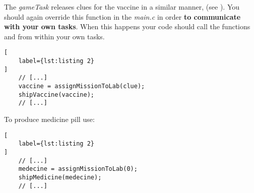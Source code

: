 The \textit{gameTask} releases clues for the vaccine in a similar manner, (see ). You should again override this function in the \textit{main.c} in order \textbf{to communicate with your own tasks}. 
When this happens your code should call the functions  and  from within your own tasks.
\begin{lstlisting}[
	label={lst:listing 2}
]
	// [...]
	vaccine = assignMissionToLab(clue);
	shipVaccine(vaccine);
	// [...]
\end{lstlisting}

To produce medicine pill use:
\begin{lstlisting}[
	label={lst:listing 2}
]
	// [...]
	medecine = assignMissionToLab(0);
	shipMedicine(medecine);
	// [...]
\end{lstlisting}

